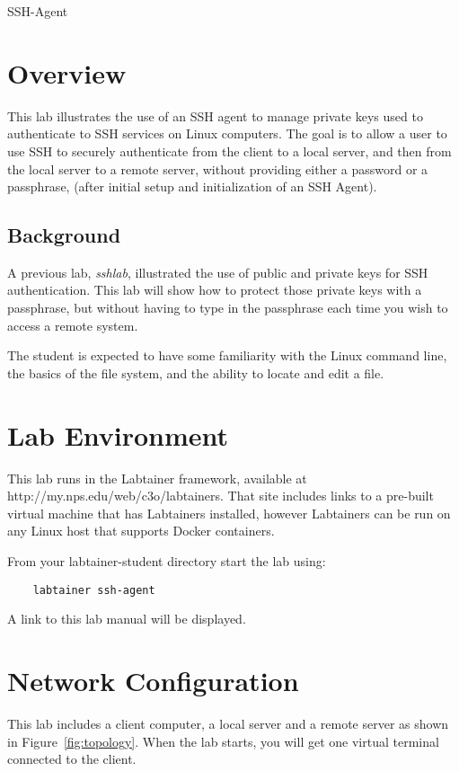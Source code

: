 


\begin{center}
{\LARGE SSH-Agent}
\vspace{0.1in}\\
\end{center}


\section{Overview}
This lab illustrates the use of an SSH agent to manage private keys used to
authenticate to SSH services on Linux computers.  The goal is to allow a user
to use SSH to securely authenticate from the client to a local server, and then from the
local server to a remote server, without providing either a password or a passphrase,
(after initial setup and initialization of an SSH Agent).

\subsection {Background}
A previous lab, \textit{sshlab},
illustrated the use of public and private keys for SSH authentication.  This lab
will show how to protect those private keys with a passphrase, but without having
to type in the passphrase each time you wish to access a remote system.

The student is expected to have some familiarity with the Linux command line,
the basics of the file system, and the ability to locate and edit a file.  

\section{Lab Environment}
This lab runs in the Labtainer framework,
available at http://my.nps.edu/web/c3o/labtainers.
That site includes links to a pre-built virtual machine
that has Labtainers installed, however Labtainers can
be run on any Linux host that supports Docker containers.

From your labtainer-student directory start the lab using:
\begin{verbatim}
    labtainer ssh-agent
\end{verbatim}
\noindent A link to this lab manual will be displayed.  


\section{Network Configuration}
This lab includes a client computer, a local server and
a remote server as shown in Figure~\ref{fig:topology}.
When the lab starts, you will get one virtual terminal connected 
to the client.



